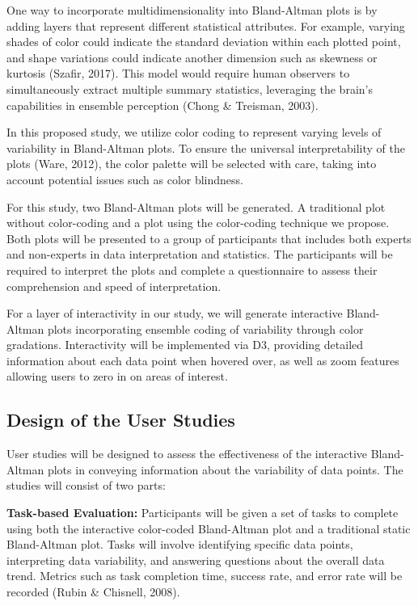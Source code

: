 \documentclass[print]{nuthesis}
\begin{document}
One way to incorporate multidimensionality into Bland-Altman plots is by adding layers that represent different statistical attributes.
For example, varying shades of color could indicate the standard deviation within each plotted point, and shape variations could indicate another dimension such as skewness or kurtosis (Szafir, 2017).
This model would require human observers to simultaneously extract multiple summary statistics, leveraging the brain's capabilities in ensemble perception (Chong \& Treisman, 2003).

In this proposed study, we utilize color coding to represent varying levels of variability in Bland-Altman plots.
To ensure the universal interpretability of the plots (Ware, 2012), the color palette will be selected with care, taking into account potential issues such as color blindness.

For this study, two Bland-Altman plots will be generated.
A traditional plot without color-coding and a plot using the color-coding technique we propose.
Both plots will be presented to a group of participants that includes both experts and non-experts in data interpretation and statistics.
The participants will be required to interpret the plots and complete a questionnaire to assess their comprehension and speed of interpretation.

For a layer of interactivity in our study, we will generate interactive Bland-Altman plots incorporating ensemble coding of variability through color gradations.
Interactivity will be implemented via D3, providing detailed information about each data point when hovered over, as well as zoom features allowing users to zero in on areas of interest.

\hypertarget{design-of-the-user-studies}{%
\subsection{Design of the User Studies}\label{design-of-the-user-studies}}

User studies will be designed to assess the effectiveness of the interactive Bland-Altman plots in conveying information about the variability of data points.
The studies will consist of two parts:

\textbf{Task-based Evaluation:} Participants will be given a set of tasks to complete using both the interactive color-coded Bland-Altman plot and a traditional static Bland-Altman plot.
Tasks will involve identifying specific data points, interpreting data variability, and answering questions about the overall data trend.
Metrics such as task completion time, success rate, and error rate will be recorded (Rubin \& Chisnell, 2008).
\end{document}
